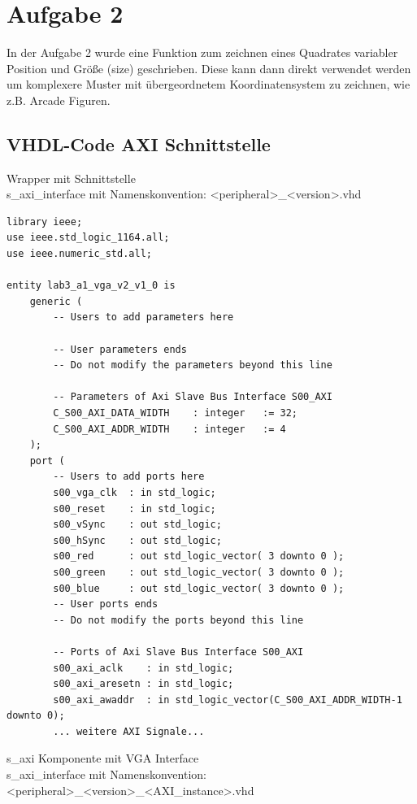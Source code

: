 \section{Aufgabe 2} \label{ex2}
In der Aufgabe 2 wurde eine Funktion zum zeichnen eines Quadrates variabler Position und Größe (size) geschrieben. Diese kann 
dann direkt verwendet werden um komplexere Muster mit übergeordnetem Koordinatensystem zu zeichnen, wie z.B. Arcade Figuren.

\subsection{VHDL-Code AXI Schnittstelle}
Wrapper mit Schnittstelle  \\
s\_axi\_interface mit Namenskonvention: <peripheral>\_<version>.vhd
\begin{verbatim}
library ieee;
use ieee.std_logic_1164.all;
use ieee.numeric_std.all;

entity lab3_a1_vga_v2_v1_0 is
	generic (
		-- Users to add parameters here

		-- User parameters ends
		-- Do not modify the parameters beyond this line

		-- Parameters of Axi Slave Bus Interface S00_AXI
		C_S00_AXI_DATA_WIDTH	: integer	:= 32;
		C_S00_AXI_ADDR_WIDTH	: integer	:= 4
	);
	port (
		-- Users to add ports here
        s00_vga_clk  : in std_logic;
        s00_reset    : in std_logic;
        s00_vSync    : out std_logic;
        s00_hSync    : out std_logic;
        s00_red      : out std_logic_vector( 3 downto 0 );
        s00_green    : out std_logic_vector( 3 downto 0 );
        s00_blue     : out std_logic_vector( 3 downto 0 );
		-- User ports ends
		-- Do not modify the ports beyond this line

		-- Ports of Axi Slave Bus Interface S00_AXI
		s00_axi_aclk	: in std_logic;
		s00_axi_aresetn	: in std_logic;
		s00_axi_awaddr	: in std_logic_vector(C_S00_AXI_ADDR_WIDTH-1 downto 0);
		... weitere AXI Signale...
\end{verbatim}

s\_axi Komponente mit VGA Interface  \\
s\_axi\_interface mit Namenskonvention: <peripheral>\_<version>\_<AXI\_instance>.vhd

